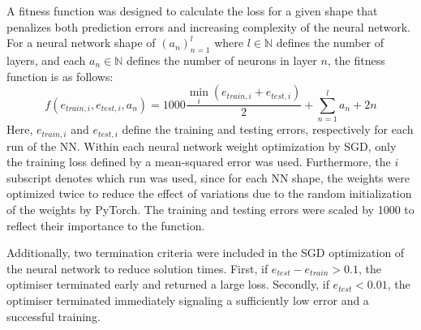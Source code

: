 \documentclass[12pt]{article}
\begin{document}
A fitness function was designed to calculate the loss for a given shape that penalizes both prediction errors and increasing complexity of the neural network. For a neural network shape of $(a_n)_{n=1}^{l}$ where $l\in\mathbb{N}$ defines the number of layers, and each $a_n \in \mathbb{N}$ defines the number of neurons in layer $n$, the fitness function is as follows: 
\begin{equation}
	 f(e_{train,i},e_{test,i},a_n) = 1000\frac{\min_i (e_{train,i} + e_{test,i})}{2} + \sum_{n=1}^{l} a_n + 2n
\end{equation}
Here, $e_{train,i}$ and $e_{test,i}$ define the training and testing errors, respectively for each run of the NN. Within each neural network weight optimization by SGD, only the training loss defined by a mean-squared error was used. Furthermore, the $i$ subscript denotes which run was used, since for each NN shape, the weights were optimized twice to reduce the effect of variations due to the random initialization of the weights by PyTorch. The training and testing errors were scaled by 1000 to reflect their importance to the function.

Additionally, two termination criteria were included in the SGD optimization of the neural network to reduce solution times. First, if $e_{test}-e_{train}>0.1$, the optimiser terminated early and returned a large loss. Secondly, if $e_{test}<0.01$, the optimiser terminated immediately signaling a sufficiently low error and a successful training. 
\end{document}
